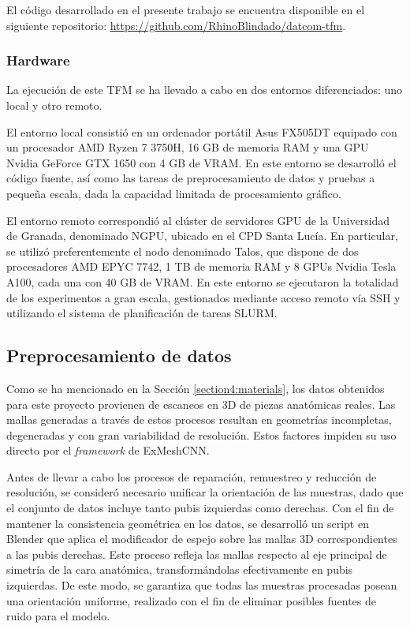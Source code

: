 El código desarrollado en el presente trabajo se encuentra disponible en el siguiente repositorio: \url{https://github.com/RhinoBlindado/datcom-tfm}.

\subsubsection{Hardware}
La ejecución de este TFM se ha llevado a cabo en dos entornos diferenciados: uno local y otro remoto.

El entorno local consistió en un ordenador portátil Asus FX505DT equipado con un procesador AMD Ryzen 7 3750H, 16 GB de memoria RAM y una GPU Nvidia GeForce GTX 1650 con 4 GB de VRAM. En este entorno se desarrolló el código fuente, así como las tareas de preprocesamiento de datos y pruebas a pequeña escala, dada la capacidad limitada de procesamiento gráfico.

El entorno remoto correspondió al clúster de servidores GPU de la Universidad de Granada, denominado NGPU, ubicado en el CPD Santa Lucía. En particular, se utilizó preferentemente el nodo denominado Talos, que dispone de dos procesadores AMD EPYC 7742, 1 TB de memoria RAM y 8 GPUs Nvidia Tesla A100, cada una con 40 GB de VRAM. En este entorno se ejecutaron la totalidad de los experimentos a gran escala, gestionados mediante acceso remoto vía SSH y utilizando el sistema de planificación de tareas SLURM.

\subsection{Preprocesamiento de datos}
Como se ha mencionado en la Sección \ref{section4:materials}, los datos obtenidos para este proyecto provienen de escaneos en 3D de piezas anatómicas reales. Las mallas generadas a través de estos procesos resultan en geometrías incompletas, degeneradas y con gran variabilidad de resolución. Estos factores impiden su uso directo por el \textit{framework} de ExMeshCNN.

Antes de llevar a cabo los procesos de reparación, remuestreo y reducción de resolución, se consideró necesario unificar la orientación de las muestras, dado que el conjunto de datos incluye tanto pubis izquierdas como derechas. Con el fin de mantener la consistencia geométrica en los datos, se desarrolló un script en Blender que aplica el modificador de espejo sobre las mallas 3D correspondientes a las pubis derechas. Este proceso refleja las mallas respecto al eje principal de simetría de la cara anatómica, transformándolas efectivamente en pubis izquierdas. De este modo, se garantiza que todas las muestras procesadas posean una orientación uniforme, realizado con el fin de eliminar posibles fuentes de ruido para el modelo.

